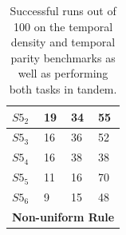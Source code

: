 \documentclass{elsarticle}
\begin{document}
\begin{multicols}{2}
\begin{table}[H]
\begin{tabular}{|l|l|l|l|}
$S5_{2}$ & 19 & 34 & 55 \\ \hline
$S5_{3}$ & 16 & 36 & 52 \\ \hline
$S5_{4}$ & 16 & 38 & 38 \\ \hline
$S5_{5}$ & 11 & 16 & 70 \\ \hline
$S5_{6}$ & 9 & 15 & 48 \\ \hline
\multicolumn{4}{|l|}{\textbf{Non-uniform Rule}} \\ \hline
\end{tabular}
\caption{Successful runs out of 100 on the temporal density and temporal parity 
   benchmarks as well as performing both tasks in tandem.
}
\label{table:results_temp_dens}
\end{table}



\end{multicols}
\end{document}
